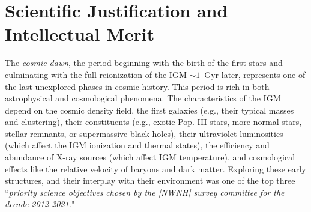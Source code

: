 \documentclass[preprint]{aastex}
\newcommand{\compress}{\vspace{-0.3in}}
\begin{document}



\compress
\section{Scientific Justification and Intellectual Merit} %



The {\it cosmic dawn}, the period beginning with the birth of the first stars and culminating with the full
reionization of the IGM 
$\sim 1$~Gyr later, represents one of the last unexplored phases in cosmic history. 
This period is rich in both astrophysical and cosmological phenomena. 
The characteristics of the IGM depend on the cosmic density field, the first galaxies (e.g., their typical masses and 
clustering), their constituents (e.g., exotic Pop. III 
stars, more normal stars, stellar remnants, or supermassive black holes), their ultraviolet luminosities (which affect
the IGM ionization and thermal states), the efficiency and abundance of X-ray sources (which affect IGM temperature), 
and cosmological effects like the relative velocity of baryons and dark matter. 
Exploring these early structures, and their interplay with their environment was one of the top three ``{\it priority science objectives chosen by 
the [NWNH] survey committee for the decade 2012-2021.}"

\end{document}

